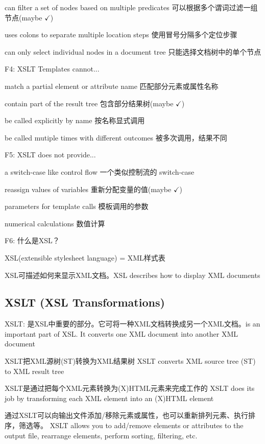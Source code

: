 \documentclass[fontset=windows]{article}
\begin{document}
\indent\indent can filter a set of nodes based on multiple predicates 可以根据多个谓词过滤一组节点(maybe $\checkmark$)

\indent\indent uses colons to separate multiple location steps 使用冒号分隔多个定位步骤

\indent\indent can only select individual nodes in a document tree 只能选择文档树中的单个节点

F4: XSLT Templates cannot...

\indent\indent match a partial element or attribute name 匹配部分元素或属性名称

\indent\indent contain part of the result tree 包含部分结果树(maybe $\checkmark$)

\indent\indent be called explicitly by name 按名称显式调用

\indent\indent be called mutiple times with different outcomes 被多次调用，结果不同

F5: XSLT does not provide...

\indent\indent a switch-case like control flow 一个类似控制流的 switch-case

\indent\indent reassign values of variables 重新分配变量的值(maybe $\checkmark$)

\indent\indent parameters for template calls 模板调用的参数

\indent\indent numerical calculations 数值计算

F6: 什么是XSL？

\indent\indent XSL(extensible stylesheet language) = XML样式表

\indent\indent XSL可描述如何来显示XML文档。XSL describes how to display XML documents

\subsection{XSLT (XSL Transformations)}

XSLT: 是XSL中重要的部分。它可将一种XML文档转换成另一个XML文档。is an important part of XSL. It converts one XML document into another XML document

\indent\indent XSLT把XML源树(ST)转换为XML结果树 XSLT converts XML source tree (ST) to XML result tree

\indent\indent XSLT是通过把每个XML元素转换为(X)HTML元素来完成工作的 XSLT does its job by transforming each XML element into an (X)HTML element

\indent\indent 通过XSLT可以向输出文件添加/移除元素或属性，也可以重新排列元素、执行排序，筛选等。
XSLT allows you to add/remove elements or attributes to the output file, rearrange elements, perform sorting, filtering, etc.
\end{document}
